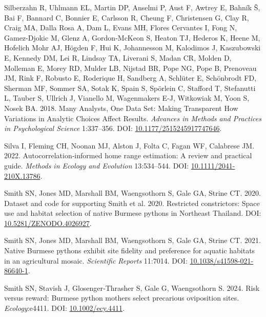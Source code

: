 \documentclass[10pt,a4paper]{article}
\newlength{\cslhangindent}
\newenvironment{CSLReferences}[2] %
 {\begin{list}{}{%
  \setlength{\itemindent}{0pt}
  \setlength{\leftmargin}{0pt}
  \setlength{\parsep}{0pt}
  \ifodd #1
   \setlength{\leftmargin}{\cslhangindent}
   \setlength{\itemindent}{-1\cslhangindent}
  \fi
  \setlength{\itemsep}{#2\baselineskip}}}
 {\end{list}}
\begin{document}
\begin{CSLReferences}{1}{0}
Silberzahn R, Uhlmann EL, Martin DP, Anselmi P, Aust F, Awtrey E, Bahník Š, Bai F, Bannard C, Bonnier E, Carlsson R, Cheung F, Christensen G, Clay R, Craig MA, Dalla Rosa A, Dam L, Evans MH, Flores Cervantes I, Fong N, Gamez-Djokic M, Glenz A, Gordon-McKeon S, Heaton TJ, Hederos K, Heene M, Hofelich Mohr AJ, Högden F, Hui K, Johannesson M, Kalodimos J, Kaszubowski E, Kennedy DM, Lei R, Lindsay TA, Liverani S, Madan CR, Molden D, Molleman E, Morey RD, Mulder LB, Nijstad BR, Pope NG, Pope B, Prenoveau JM, Rink F, Robusto E, Roderique H, Sandberg A, Schlüter E, Schönbrodt FD, Sherman MF, Sommer SA, Sotak K, Spain S, Spörlein C, Stafford T, Stefanutti L, Tauber S, Ullrich J, Vianello M, Wagenmakers E-J, Witkowiak M, Yoon S, Nosek BA. 2018. Many {Analysts}, {One} {Data} {Set}: {Making} {Transparent} {How} {Variations} in {Analytic} {Choices} {Affect} {Results}. \emph{Advances in Methods and Practices in Psychological Science} 1:337--356. DOI: \href{https://doi.org/10.1177/2515245917747646}{10.1177/2515245917747646}.

Silva I, Fleming CH, Noonan MJ, Alston J, Folta C, Fagan WF, Calabrese JM. 2022. Autocorrelation‐informed home range estimation: {A} review and practical guide. \emph{Methods in Ecology and Evolution} 13:534--544. DOI: \href{https://doi.org/10.1111/2041-210X.13786}{10.1111/2041-210X.13786}.

Smith SN, Jones MD, Marshall BM, Waengsothorn S, Gale GA, Strine CT. 2020. Dataset and code for supporting {Smith} et al. 2020. {Restricted} constrictors: {Space} use and habitat selection of native {Burmese} pythons in {Northeast} {Thailand}. DOI: \href{https://doi.org/10.5281/ZENODO.4026927}{10.5281/ZENODO.4026927}.

Smith SN, Jones MD, Marshall BM, Waengsothorn S, Gale GA, Strine CT. 2021. Native {Burmese} pythons exhibit site fidelity and preference for aquatic habitats in an agricultural mosaic. \emph{Scientific Reports} 11:7014. DOI: \href{https://doi.org/10.1038/s41598-021-86640-1}{10.1038/s41598-021-86640-1}.

Smith SN, Stavish J, Glosenger‐Thrasher S, Gale G, Waengsothorn S. 2024. Risk versus reward: {Burmese} python mothers select precarious oviposition sites. \emph{Ecology}:e4411. DOI: \href{https://doi.org/10.1002/ecy.4411}{10.1002/ecy.4411}.


\end{CSLReferences}
\end{document}

